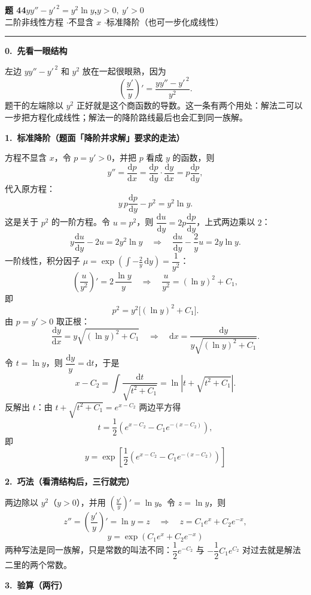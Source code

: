 \documentclass[11pt,a4paper]{ctexart}
\newcommand{\dd}{\mathrm{d}}
\begin{document}
{\color{mainblue}\Large\bfseries 题 44\quad $yy''-y'^{\,2}=y^{2}\ln y$,\quad $y>0,\ y'>0$}\\[1pt]
{\color{mainblue}\small 二阶非线性方程 \quad$\cdot$\quad 不显含 $x$ \quad$\cdot$\quad 标准降阶（也可一步化成线性）}

\vspace{0.2em}
\noindent\rule{\linewidth}{0.6pt}

\textbf{0.\ 先看一眼结构}

左边 $yy''-y'^{\,2}$ 和 $y^{2}$ 放在一起很眼熟，因为
\[
\left(\frac{y'}{y}\right)'=\frac{yy''-y'^{\,2}}{y^{2}} .
\]
题干的左端除以 $y^{2}$ 正好就是这个商函数的导数。这一条有两个用处：解法二可以一步把方程化成线性；解法一的降阶路线最后也会汇到同一族解。

\textbf{1.\ 标准降阶（题面「降阶并求解」要求的走法）}

方程不显含 $x$，令 $p=y'>0$，并把 $p$ 看成 $y$ 的函数，则
\[
y''=\frac{\dd p}{\dd x}=\frac{\dd p}{\dd y}\cdot\frac{\dd y}{\dd x}=p\frac{\dd p}{\dd y},
\]
代入原方程：
\[
y\,p\frac{\dd p}{\dd y}-p^{2}=y^{2}\ln y .
\]
这是关于 $p^{2}$ 的一阶方程。令 $u=p^{2}$，则 $\dfrac{\dd u}{\dd y}=2p\dfrac{\dd p}{\dd y}$，上式两边乘以 $2$：
\[
y\frac{\dd u}{\dd y}-2u=2y^{2}\ln y
\quad\Longrightarrow\quad
\frac{\dd u}{\dd y}-\frac{2}{y}u=2y\ln y .
\]
一阶线性，积分因子 $\mu=\exp\!\left(\int-\frac{2}{y}\,\dd y\right)=\dfrac{1}{y^{2}}$：
\[
\left(\frac{u}{y^{2}}\right)'=2\,\frac{\ln y}{y}
\quad\Longrightarrow\quad
\frac{u}{y^{2}}=(\ln y)^{2}+C_1,
\]
即
\[
p^{2}=y^{2}\bigl[(\ln y)^{2}+C_1\bigr].
\]
由 $p=y'>0$ 取正根：
\[
\frac{\dd y}{\dd x}=y\sqrt{(\ln y)^{2}+C_1}
\quad\Longrightarrow\quad
\dd x=\frac{\dd y}{y\sqrt{(\ln y)^{2}+C_1}} .
\]
令 $t=\ln y$，则 $\dfrac{\dd y}{y}=\dd t$，于是
\[
x-C_2=\int\frac{\dd t}{\sqrt{t^{2}+C_1}}=\ln\left|t+\sqrt{t^{2}+C_1}\right| .
\]
反解出 $t$：由 $t+\sqrt{t^{2}+C_1}=e^{x-C_2}$ 两边平方得
\[
t=\frac{1}{2}\left(e^{x-C_2}-C_1e^{-(x-C_2)}\right),
\]
即
\[
\boxed{\;y=\exp\left[\frac{1}{2}\left(e^{x-C_2}-C_1e^{-(x-C_2)}\right)\right]\;}
\]

\textbf{2.\ 巧法（看清结构后，三行就完）}

两边除以 $y^{2}$（$y>0$），并用 $\left(\frac{y'}{y}\right)'=\ln y$。令 $z=\ln y$，则
\[
z''=\left(\frac{y'}{y}\right)'=\ln y=z
\quad\Longrightarrow\quad
z=C_1e^{x}+C_2e^{-x},
\]
\[
\boxed{\;y=\exp\left(C_1e^{x}+C_2e^{-x}\right)\;}
\]
两种写法是同一族解，只是常数的叫法不同：$\dfrac{1}{2}e^{-C_2}$ 与 $-\dfrac{1}{2}C_1e^{C_2}$ 对过去就是解法二里的两个常数。

\textbf{3.\ 验算（两行）}
\end{document}
